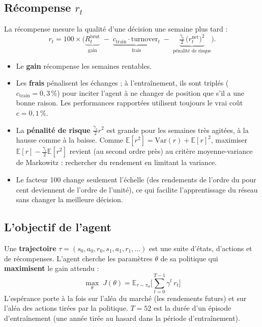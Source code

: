 \documentclass[11pt,a4paper]{article}
\newcommand{\E}{\mathbb{E}}
\begin{document}
\subsection{Récompense \(r_t\)}
La récompense mesure la qualité d'une décision une semaine plus tard :
\begin{equation}
  r_t = 100\times\Big(\underbrace{R^{\text{brut}}_t}_{\text{gain}}
  \;-\;\underbrace{c_{\text{train}}\cdot\text{turnover}_t}_{\text{frais}}
  \;-\;\underbrace{\tfrac{\gamma_{\text{r}}}{2}\,\big(r^{\text{net}}_t\big)^2}_{\text{pénalité de risque}}\Big).
\end{equation}
\begin{itemize}
  \item Le \textbf{gain} récompense les semaines rentables.
  \item Les \textbf{frais} pénalisent les échanges ; à l'entraînement, ils sont triplés
        (\(c_{\text{train}}=0{,}3\,\%\)) pour inciter l'agent à ne changer de position que s'il a une bonne raison.
        Les performances rapportées utilisent toujours le vrai coût \(c=0{,}1\,\%\).
  \item La \textbf{pénalité de risque} \(\frac{\gamma_{\text{r}}}{2}r^2\) est grande pour les semaines très
        agitées, à la hausse comme à la baisse. Comme \(\E[r^2]=\mathrm{Var}(r)+\E[r]^2\), maximiser
        \(\E[r]-\frac{\gamma_{\text{r}}}{2}\E[r^2]\) revient (au second ordre près) au critère moyenne-variance de
        Markowitz : rechercher du rendement en limitant la variance.
  \item Le facteur 100 change seulement l'échelle (des rendements de l'ordre du pour cent deviennent de l'ordre
        de l'unité), ce qui facilite l'apprentissage du réseau sans changer la meilleure décision.
\end{itemize}

\subsection{L'objectif de l'agent}
Une \textbf{trajectoire} \(\tau=(s_0,a_0,r_0,s_1,a_1,r_1,\dots)\) est une suite d'états, d'actions et de
récompenses. L'agent cherche les paramètres \(\theta\) de sa politique qui \textbf{maximisent} le gain attendu :
\begin{equation}
  \boxed{\;\max_\theta\; J(\theta)=\E_{\tau\sim\pi_\theta}\Big[\sum_{t=0}^{T-1}\gamma^{t}\,r_t\Big]\;}
\end{equation}
L'espérance porte à la fois sur l'aléa du marché (les rendements futurs) et sur l'aléa des actions tirées par la
politique. \(T=52\) est la durée d'un épisode d'entraînement (une année tirée au hasard dans la période
d'entraînement).
\end{document}
